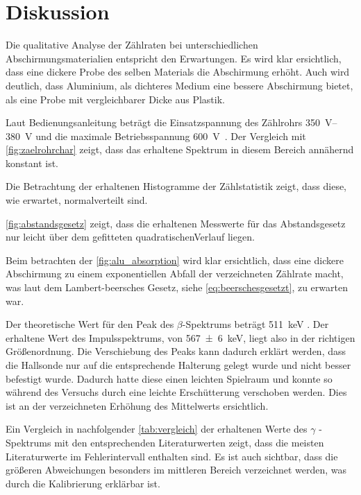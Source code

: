 \documentclass[12pt,english,ngerman]{scrartcl}
\begin{document}
\section{Diskussion}\label{sec:diskussion}

Die qualitative Analyse der Zählraten bei unterschiedlichen
Abschirmungsmaterialien entspricht den Erwartungen. Es wird klar ersichtlich,
dass eine dickere Probe des selben Materials die Abschirmung erhöht. Auch wird
deutlich, dass Aluminium, als dichteres Medium eine bessere Abschirmung bietet,
als eine Probe mit vergleichbarer Dicke aus Plastik.

Laut Bedienungsanleitung beträgt die Einsatzspannung des Zählrohrs
\SIrange{350}{380}{\volt} und die maximale Betriebsspannung
\SI{600}{\volt}~\cite{zaehlrohrdoku}. Der Vergleich mit
\autoref{fig:zaelrohrchar} zeigt, dass das erhaltene Spektrum in diesem Bereich
annähernd konstant ist.

Die Betrachtung der erhaltenen Histogramme der Zählstatistik zeigt, dass diese,
wie erwartet, normalverteilt sind.

\autoref{fig:abstandsgesetz} zeigt, dass die erhaltenen Messwerte für das Abstandsgesetz nur leicht über dem gefitteten
quadratischenVerlauf liegen.

Beim betrachten der \autoref{fig:alu_absorption} wird klar ersichtlich, dass
eine dickere Abschirmung zu einem exponentiellen Abfall der verzeichneten
Zählrate macht, was laut dem Lambert-beersches Gesetz, siehe
\autoref{eq:beerschesgesetzt}, zu erwarten war.

Der theoretische Wert für den Peak des $\beta$-Spektrums beträgt
\SI{511}{\kilo\electronvolt} \cite[]{leifi}. Der erhaltene Wert des
Impulsspektrums, von \SI{567(6)}{\kilo\electronvolt}, liegt also in der
richtigen Größenordnung. Die Verschiebung des Peaks kann dadurch erklärt
werden, dass die Hallsonde nur auf die entsprechende Halterung gelegt wurde und
nicht besser befestigt wurde. Dadurch hatte diese einen leichten Spielraum und
konnte so während des Versuchs durch eine leichte Erschütterung verschoben
werden. Dies ist an der verzeichneten Erhöhung des Mittelwerts ersichtlich.

Ein Vergleich in nachfolgender \autoref{tab:vergleich} der erhaltenen Werte des
$\gamma$ - Spektrums mit den entsprechenden Literaturwerten zeigt, dass die
meisten Literaturwerte im Fehlerintervall enthalten sind. Es ist auch sichtbar,
dass die größeren Abweichungen besonders im mittleren Bereich verzeichnet
werden, was durch die Kalibrierung erklärbar ist.
\end{document}
